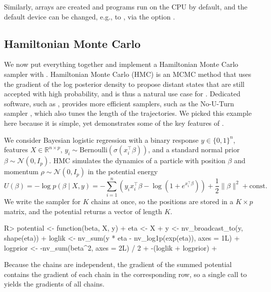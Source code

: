\documentclass[article,shortnames]{jss}
\newcommand{\R}{\mathds{R}}
\renewenvironment{CodeChunk}{\par\addvspace{0.6\baselineskip}\noindent\begin{minipage}{\linewidth}}{\end{minipage}\par\vspace{0.6\baselineskip}}
\begin{document}
Similarly, arrays are created and programs run on the CPU by default, and the default device can be changed, e.g., to , via the option .

\subsection{Hamiltonian Monte Carlo}\label{hmc}

We now put everything together and implement a Hamiltonian Monte Carlo sampler with .
Hamiltonian Monte Carlo (HMC) \citep{ref-neal2011mcmc} is an MCMC method that uses the gradient of the log posterior density to propose distant states that are still accepted with high probability, and is thus a natural use case for .
Dedicated software, such as  \citep{ref-stan}, provides more efficient samplers, such as the No-U-Turn sampler \citep{ref-nuts}, which also tunes the length of the trajectories.
We picked this example here because it is simple, yet demonstrates some of the key features of .

We consider Bayesian logistic regression with a binary response $y \in \{0, 1\}^n$, features $X \in \R^{n \times p}$, $y_i \sim \text{Bernoulli}(\sigma(x_i^\top \beta))$, and a standard normal prior $\beta \sim \mathcal{N}(0, I_p)$.
HMC simulates the dynamics of a particle with position $\beta$ and momentum $\rho \sim \mathcal{N}(0, I_p)$ in the potential energy
\[U(\beta) = -\log p(\beta \mid X, y) = -\sum_{i = 1}^n \left(y_i x_i^\top \beta - \log(1 + e^{x_i^\top \beta})\right) + \frac{1}{2}\lVert \beta \rVert^2 + \text{const}.\]
We write the sampler for $K$ chains at once, so the positions are stored in a $K \times p$ matrix, and the potential returns a vector of length $K$.

\begin{CodeChunk}
\begin{CodeInput}
R> potential <- function(beta, X, y) {
+    eta <- X %
+    y <- nv_broadcast_to(y, shape(eta))
+    loglik <- nv_sum(y * eta - nv_log1p(exp(eta)), axes = 1L)
+    logprior <- -nv_sum(beta^2, axes = 2L) / 2
+    -(loglik + logprior)
+  }
\end{CodeInput}
\end{CodeChunk}

Because the chains are independent, the gradient of the summed potential contains the gradient of each chain in the corresponding row, so a single call to  yields the gradients of all chains.
\end{document}
